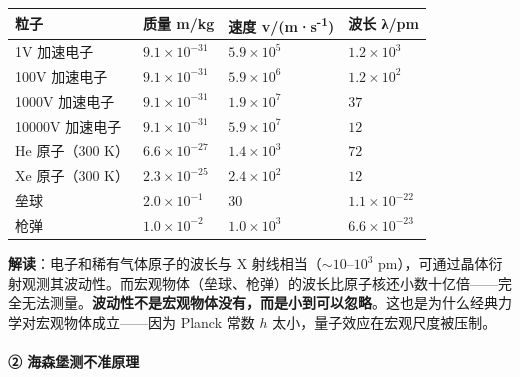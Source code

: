 \documentclass[a4paper,11pt]{ctexart}
\newcounter{none}
\begin{document}
{\def\LTcaptype{none} %
\begin{longtable}[]{@{}
  >{\raggedright\arraybackslash}p{}
  >{\raggedleft\arraybackslash}p{}
  >{\centering\arraybackslash}p{}
  >{\centering\arraybackslash}p{}@{}}
\toprule\noalign{}
\begin{minipage}[b]{\linewidth}\raggedright
粒子
\end{minipage} & \begin{minipage}[b]{\linewidth}\raggedleft
质量 m/kg
\end{minipage} & \begin{minipage}[b]{\linewidth}\centering
速度 v/(m·s\textsuperscript{-1})
\end{minipage} & \begin{minipage}[b]{\linewidth}\centering
波长 λ/pm
\end{minipage} \\
\midrule\noalign{}
\endhead
\bottomrule\noalign{}
\endlastfoot
1V 加速电子 & \(9.1\times 10^{-31}\) & \(5.9\times 10^5\) & \(1.2\times 10^{3}\) \\
100V 加速电子 & \(9.1\times 10^{-31}\) & \(5.9\times 10^6\) & \(1.2\times 10^{2}\) \\
1000V 加速电子 & \(9.1\times 10^{-31}\) & \(1.9\times 10^7\) & \(37\) \\
10000V 加速电子 & \(9.1\times 10^{-31}\) & \(5.9\times 10^7\) & \(12\) \\
He 原子（300 K） & \(6.6\times 10^{-27}\) & \(1.4\times 10^3\) & \(72\) \\
Xe 原子（300 K） & \(2.3\times 10^{-25}\) & \(2.4\times 10^2\) & \(12\) \\
垒球 & \(2.0\times 10^{-1}\) & \(30\) & \(1.1\times 10^{-22}\) \\
枪弹 & \(1.0\times 10^{-2}\) & \(1.0\times 10^3\) & \(6.6\times 10^{-23}\) \\
\end{longtable}
}

\textbf{解读}：电子和稀有气体原子的波长与 X 射线相当（\(\sim 10\text{–}10^3\) pm），可通过晶体衍射观测其波动性。而宏观物体（垒球、枪弹）的波长比原子核还小数十亿倍------完全无法测量。\textbf{波动性不是宏观物体没有，而是小到可以忽略}。这也是为什么经典力学对宏观物体成立------因为 Planck 常数 \(h\) 太小，量子效应在宏观尺度被压制。

\paragraph{② 海森堡测不准原理}\label{ux6d77ux68eeux5821ux6d4bux4e0dux51c6ux539fux7406}
\end{document}
